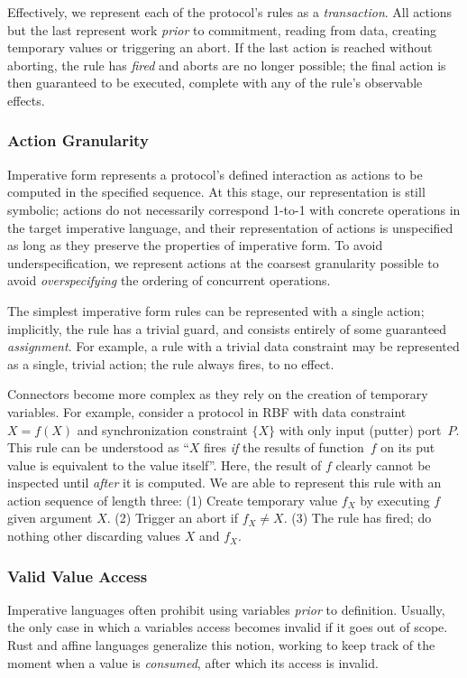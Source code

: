 Effectively, we represent each of the protocol's rules as a \textit{transaction}. All actions but the last represent work \textit{prior} to commitment, reading from data, creating temporary values or triggering an abort. If the last action is reached without aborting, the rule has \textit{fired} and aborts are no longer possible; the final action is then guaranteed to be executed, complete with any of the rule's observable effects. 

\subsubsection{Action Granularity}
Imperative form represents a protocol's defined interaction as actions to be computed in the specified sequence. At this stage, our representation is still symbolic; actions do not necessarily correspond 1-to-1 with concrete operations in the target imperative language, and their representation of actions is unspecified as long as they preserve the properties of imperative form. To avoid underspecification, we represent actions at the coarsest granularity possible to avoid \textit{overspecifying} the ordering of concurrent operations.

The simplest imperative form rules can be represented with a single action; implicitly, the rule has a trivial guard, and consists entirely of some guaranteed \textit{assignment}. For example, a rule with a trivial data constraint may be represented as a single, trivial action; the rule always fires, to no effect.

Connectors become more complex as they rely on the creation of temporary variables. For example, consider a protocol in RBF with data constraint $X=f(X)$ and synchronization constraint $\{X\}$ with only input (putter) port~$P$. This rule can be understood as ``$X$ fires \textit{if} the results of function~$f$ on its put value is equivalent to the value itself''. Here, the result of $f$ clearly cannot be inspected until \textit{after} it is computed. We are able to represent this rule with an action sequence of length three: (1) Create temporary value $f_X$ by executing $f$ given argument $X$. (2) Trigger an abort if $f_X\neq{}X$. (3) The rule has fired; do nothing other discarding values $X$ and $f_X$.


\subsubsection{Valid Value Access}
Imperative languages often prohibit using variables \textit{prior} to definition. Usually, the only case in which a variables access becomes invalid if it goes out of scope. Rust and affine languages generalize this notion, working to keep track of the moment when a value is \textit{consumed}, after which its access is invalid. 

